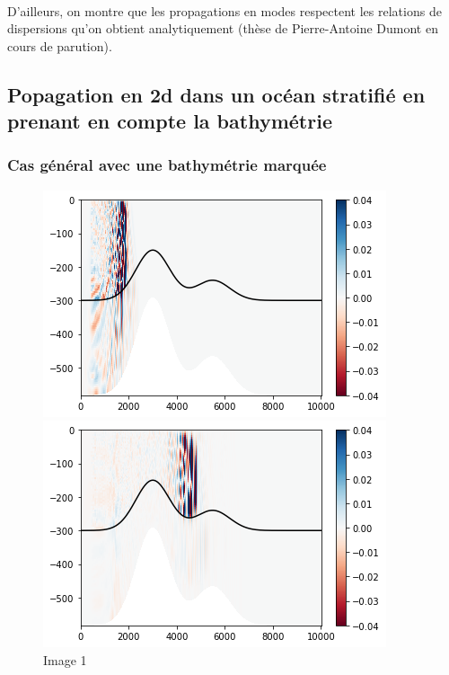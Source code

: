 \documentclass{rapportECC}
\begin{document}
\\
D'ailleurs, on montre que les propagations en modes respectent les relations de dispersions qu'on obtient analytiquement (thèse de Pierre-Antoine Dumont en cours de parution).

\subsection{Popagation en 2d dans un océan stratifié en prenant en compte la bathymétrie}


\subsubsection{Cas général avec une bathymétrie marquée}

\begin{figure}[H] %
    \centering
    \begin{minipage}{0.45\textwidth}
        \centering
        \includegraphics[width=\linewidth]{images/im2.png}
        \caption{Image 1}
        \label{fig:image1}
    \end{minipage}
    \hspace{0.05\textwidth} %
    \begin{minipage}{0.45\textwidth}
        \centering
        \includegraphics[width=\linewidth]{images/im4.png}

\end{minipage}
\end{figure}
\end{document}
